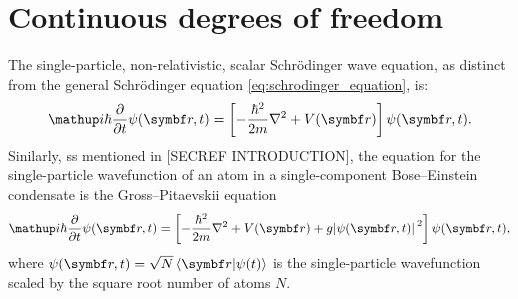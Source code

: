 



\section{Continuous degrees of freedom}\label{sec:continuous_dof}
The single-particle, non-relativistic, scalar Schr\"odinger wave equation, as distinct from the general Schr\"odinger equation \eqref{eq:schrodinger_equation}, is:
\begin{align}\label{eq:schrodinger_wave_equation}
\ii\hbar\pdv{}{t}\psi(\vec r, t) = \left[-\frac{\hbar^2}{2m} \nabla^2 + V(\vec r)\right]\psi(\vec r, t).
\end{align}
Sinilarly, ss mentioned in [SECREF INTRODUCTION], the equation for the single-particle wavefunction of an atom in a single-component Bose--Einstein condensate is the Gross--Pitaevskii equation
\begin{align}
\ii\hbar\pdv{}{t}\psi(\vec r, t) = \left[-\frac{\hbar^2}{2m} \nabla^2 + V(\vec r) + g\abs{\psi(\vec r, t)}^2\right]\psi(\vec r, t),
\end{align}
where $\psi(\vec r, t) = \sqrt{N}\braket{\vec r}{\psi(t)}$ is the single-particle wavefunction scaled by the square root number of atoms $N$.

